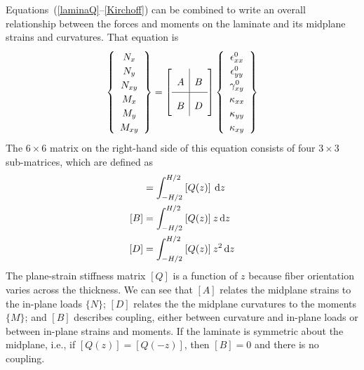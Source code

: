 \documentclass[11pt]{article}
\begin{document}
Equations~(\ref{laminaQ}--\ref{Kirchoff}) can be combined to write an overall relationship between the forces and moments on the laminate and its midplane strains and curvatures.  That equation is
\begin{equation}
\renewcommand\arraystretch{1.2}
   \left\{ \begin{array}{c}
     N_x \\ N_y \\ N_{xy} \\  M_x \\ M_y \\ M_{xy}
   \end{array} \right\}
   =
\renewcommand\arraystretch{2}
   \left[ \begin{array}{c|c}
            A & B \\
            \hline
            B & D
      \end{array} \right]
\renewcommand\arraystretch{1.2}
        \left\{ \begin{array}{c}
           \epsilon^0_{xx}  \\  \epsilon^0_{yy}  \\  \gamma^0_{xy}  \\ \kappa_{xx}  \\  \kappa_{yy}  \\  \kappa_{xy}
           \end{array} \right\}
     \label{laminateStiffness}     
\end{equation}
The $6 \times 6$ matrix on the right-hand side of this equation consists of four $3 \times 3$ sub-matrices, which are defined as
\begin{align}
     [A] &= \int_{-H/2}^{H/2} \: [Q(z)] \: \ud z  \label{Amatrix} \\
     [B] &= \int_{-H/2}^{H/2} \: [Q(z)] \: z \ud z \label{Bmatrix}  \\
     [D] &= \int_{-H/2}^{H/2}\: [Q(z)] \: z^2 \ud z  \label{Dmatrix}
\end{align}
The plane-strain stiffness matrix $[Q]$ is a function of $z$ because fiber orientation varies across the thickness.  We can see that $[A]$ relates the midplane strains to the in-plane loads $\{ N \}$; $[D]$ relates the the midplane curvatures to the moments $\{ M \}$; and $[B]$ describes coupling, either between curvature and in-plane loads or between in-plane strains and moments.  If the laminate is symmetric about the midplane, i.e., if $[Q(z)] = [Q(-z)]$, then $[B] = 0$ and there is no coupling.  
\end{document}
